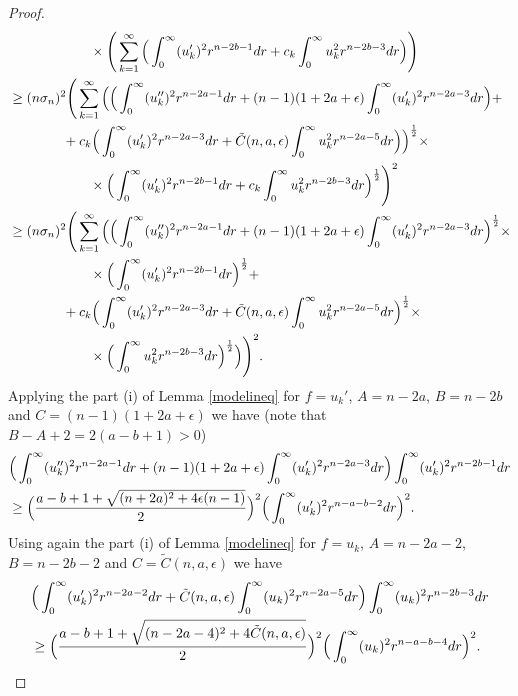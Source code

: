 \documentclass[10pt,a4paper]{amsart}
\def\ep{\epsilon}%
\begin{document}
\begin{proof}
\begin{align}
&\qquad\qquad \qquad \times \Bigg(\sum_{k=1}^\infty\Big(\int_0^\infty (u_k')^2 r^{n-2b -1} dr + c_k \int_0^\infty u_k^2 r^{n -2b -3} dr\Big)\Bigg)\notag\\
&\geq (n\sigma_n)^2 \Bigg(\sum_{k=1}^\infty\Big(\Big(\int_0^\infty (u_k'')^2 r^{n-2a -1} dr + (n-1)(1+2a+\epsilon)\int_0^\infty (u_k')^2 r^{n-2a -3} dr\Big) +\notag\\
&\qquad\qquad +c_k\Big(\int_0^\infty (u_k')^2 r^{n-2a -3} dr +  \tilde{C}(n,a,\epsilon)\int_0^\infty u_k^2 r^{n -2a -5} dr\Big)\Big)^{\frac12}\times \notag\\
&\qquad\qquad\qquad \times \Big(\int_0^\infty (u_k')^2 r^{n-2b -1} dr + c_k \int_0^\infty u_k^2 r^{n -2b -3} dr\Big)^{\frac12}\Bigg)^2\notag\\
&\geq (n\sigma_n)^2 \Bigg(\sum_{k=1}^\infty\Big(\Big(\int_0^\infty (u_k'')^2 r^{n-2a -1} dr + (n-1)(1+2a+\epsilon)\int_0^\infty (u_k')^2 r^{n-2a -3} dr\Big)^{\frac12} \times\notag\\
&\qquad\qquad\qquad \times \Big(\int_0^\infty (u_k')^2 r^{n-2b -1} dr\Big)^{\frac12}+ \notag\\
&\qquad\qquad + c_k\Big(\int_0^\infty (u_k')^2 r^{n-2a -3} dr +  \tilde{C}(n,a,\epsilon)\int_0^\infty u_k^2 r^{n -2a -5} dr\Big)^{\frac12} \times\notag\\
&\qquad\qquad\qquad \times\Big(\int_0^\infty u_k^2 r^{n -2b -3} dr\Big)^{\frac12}\Big) \Bigg)^2.
\end{align}
Applying the part (i) of Lemma \ref{modelineq} for $f = u_k'$, $A = n-2a$, $B =n-2b$ and $C = (n-1)(1 + 2a +\epsilon)$ we have (note that $B-A +2 = 2(a-b +1) >0$)
\begin{align*}
&\Big(\int_0^\infty (u_k'')^2 r^{n-2a -1} dr + (n-1)(1+2a+\epsilon)\int_0^\infty (u_k')^2 r^{n-2a -3} dr\Big)\int_0^\infty (u_k')^2 r^{n-2b -1} dr\notag\\
&\geq \Big(\frac{a-b+1 + \sqrt{(n+2a)^2 + 4\ep(n-1)}}2\Big)^2 \Big(\int_0^\infty (u_k')^2 r^{n-a-b -2} dr\Big)^2.
\end{align*}
Using again the part (i) of Lemma \ref{modelineq} for $f = u_k$, $A = n-2a-2$, $B =n-2b-2$ and $C = \tilde C(n,a,\epsilon)$ we have
\begin{align*}
&\Big(\int_0^\infty (u_k')^2 r^{n-2a -2} dr +  \tilde{C}(n,a,\epsilon)\int_0^\infty (u_k)^2 r^{n-2a -5} dr\Big)\int_0^\infty (u_k)^2 r^{n-2b -3} dr\notag\\
&\geq \Big(\frac{a-b+1 + \sqrt{(n-2a-4)^2 + 4 \tilde{C}(n,a,\epsilon)}}2\Big)^2 \Big(\int_0^\infty (u_k)^2 r^{n-a-b -4} dr\Big)^2.
\end{align*}

\end{proof}
\end{document}
